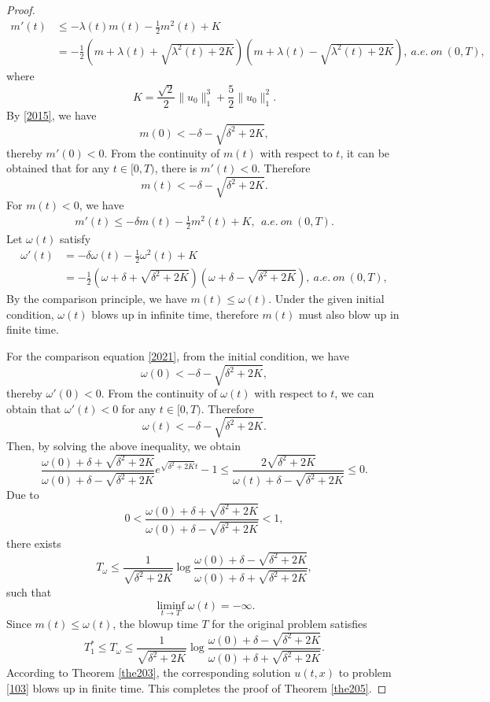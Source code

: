 \documentclass[preprint,12pt]{elsarticle}
\numberwithin{equation}{section}
\begin{document}
\begin{proof}
\begin{align}
m'(t)&\leq-\lambda(t) m(t)-\frac{1}{2}m^{2}(t)+K\nonumber\\
&=-\frac{1}{2}(m+\lambda(t)+\sqrt{\lambda^{2}(t)+2K})(m+\lambda(t)-\sqrt{\lambda^{2}(t)+2K}),\ a.e.\ on\ (0,T),
\label{2019}
\end{align}
where $$K=\frac{\sqrt{2}}{2}\|u_{0}\|^{3}_{1}+\frac{5}{2}\|u_{0}\|^{2}_{1}.$$
By \eqref{2015}, we have
$$m(0)<-\delta-\sqrt{\delta^{2}+2K},$$
thereby $m'(0)<0$. From the continuity of $m(t)$ with respect to $t$, it can be obtained that for any $t\in[0,T)$, there is $m'(t)<0$. Therefore
$$m(t)<-\delta-\sqrt{\delta^{2}+2K}.$$
For $m(t)<0$, we have
\begin{eqnarray}
m'(t)\leq-\delta m(t)-\frac{1}{2}m^{2}(t)+K,\ \ a.e.\ on\ (0,T).
\label{2020}
\end{eqnarray}
Let $\omega(t)$ satisfy
\begin{align}
\omega'(t)&=-\delta \omega(t)-\frac{1}{2}\omega^{2}(t)+K\nonumber\\
&=-\frac{1}{2}(\omega+\delta+\sqrt{\delta^{2}+2K})(\omega+\delta-\sqrt{\delta^{2}+2K}),\ a.e.\ on\ (0,T),
\label{2021}
\end{align}
By the comparison principle, we have $m(t)\leq \omega(t)$. Under the given initial condition, $\omega(t)$ blows up in infinite time, therefore $m(t)$ must also blow up in finite time.

For the comparison equation \eqref{2021}, from the initial condition, we have
$$\omega(0)<-\delta-\sqrt{\delta^{2}+2K},$$
 thereby $\omega'(0)<0$. From the continuity of $\omega(t)$ with respect to $t$, we can obtain that $\omega'(t)<0$ for any $t\in[0,T)$. Therefore
$$\omega(t)<-\delta-\sqrt{\delta^{2}+2K}.$$
Then, by solving the above inequality, we obtain
\begin{equation*}
\frac{\omega(0)+\delta+\sqrt{\delta^{2}+2K}}
{\omega(0)+\delta-\sqrt{\delta^{2}+2K}}
e^{\sqrt{\delta^{2}+2K}t}-1
\leq\frac{2\sqrt{\delta^{2}+2K}}
{\omega(t)+\delta-\sqrt{\delta^{2}+2K}}\leq 0.
\end{equation*}
Due to
$$0<\frac{\omega(0)+\delta+\sqrt{\delta^{2}+2K}}
{\omega(0)+\delta-\sqrt{\delta^{2}+2K}}<1,$$
there exists
$$T_{\omega}\leq \frac{1}{\sqrt{\delta^{2}+2K}}\log \frac{\omega(0)+\delta-\sqrt{\delta^{2}+2K}}
{\omega(0)+\delta+\sqrt{\delta^{2}+2K}},$$
such that $$\liminf_{t\rightarrow T}\omega(t)=-\infty.$$
Since $m(t)\leq \omega(t)$, the blowup time $T$ for the original problem satisfies
$$T_{1}^{*}\leq T_{\omega}\leq \frac{1}{\sqrt{\delta^{2}+2K}}\log \frac{\omega(0)+\delta-\sqrt{\delta^{2}+2K}}
{\omega(0)+\delta+\sqrt{\delta^{2}+2K}}.$$
According to Theorem \ref{the203}, the corresponding solution $u(t,x)$ to problem \eqref{103} blows up in finite time. This completes the proof of Theorem \ref{the205}.
\end{proof}
\end{document}
